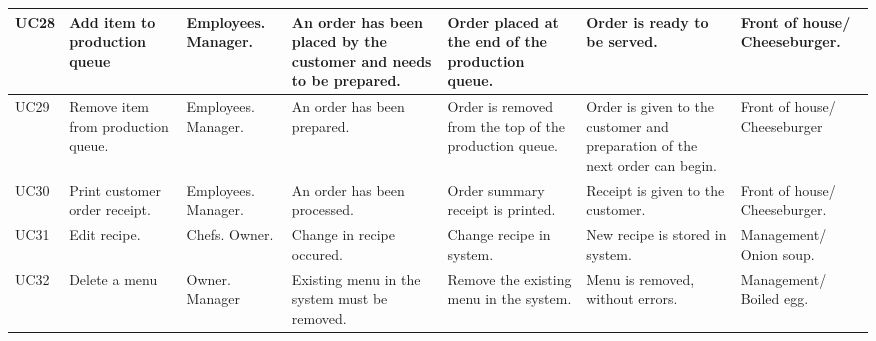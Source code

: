 \begin{tabularx}{\linewidth}{|X|X|X|X|X|X|X|}
\hline
UC28 & Add item to production queue & Employees. Manager. & An order has been placed by the customer and needs to be prepared. & Order placed at the end of the production queue. & Order is ready to be served. & Front of house/ Cheeseburger. \\
\hline
UC29 & Remove item from production queue. & Employees. Manager. & An order has been prepared. & Order is removed from the top of the production queue. & Order is given to the customer and preparation of the next order can begin. & Front of house/ Cheeseburger \\
\hline
UC30 & Print customer order receipt. & Employees. Manager. & An order has been processed. & Order summary receipt is printed. & Receipt is given to the customer. & Front of house/ Cheeseburger. \\
\hline
UC31 & Edit recipe. & Chefs. Owner. & Change in recipe occured. & Change recipe in system. & New recipe is stored in system. & Management/ Onion soup. \\
\hline
UC32 & Delete a menu & Owner. Manager & Existing menu in the system must be removed. & Remove the existing menu in the system. & Menu is removed, without errors. & Management/ Boiled egg. \\
\hline
\end{tabularx}